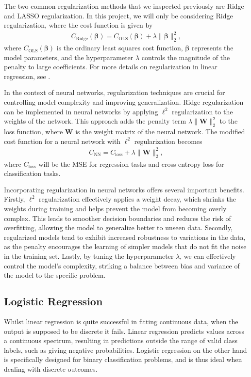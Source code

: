 \documentclass[%
reprint,s
amsmath,amssymb,
aps,
]{revtex4-2}
\begin{document}
The two common regularization methods that we inspected previously are Ridge and LASSO regularization. In this project, we will only be considering Ridge regularization, where the cost function is given by
\begin{align}
	C_\text{Ridge}(\bm \beta)=C_\text{OLS}(\bm\beta)+\lambda\|\bm\beta\|_2^2,
\end{align}
where \(C_\text{OLS}(\bm\beta)\) is the ordinary least squares cost function, \(\bm\beta\) represents the model parameters, and the hyperparameter \(\lambda\) controls the magnitude of the penalty to large coefficients. For more details on regularization in linear regression, see \cite{project1}.

In the context of neural networks, regularization techniques are crucial for controlling model complexity and improving generalization. Ridge regularization can be implemented in neural networks by applying \(\ell^2\) regularization to the weights of the network. This approach adds the penalty term \( \lambda \|\mathbf{W}\|_2^2 \) to the loss function, where \( \mathbf{W} \) is the weight matrix of the neural network. The modified cost function for a neural network with \(\ell^2\) regularization becomes
\begin{align}
	C_{\text{NN}}=C_{\text{loss}}+\lambda \|\mathbf{W}\|_2^2,
\end{align}
where \( C_{\text{loss}} \) will be the MSE for regression tasks and cross-entropy loss for classification tasks.

Incorporating regularization in neural networks offers several important benefits. Firstly, \(\ell^2\) regularization effectively applies a weight decay, which shrinks the weights during training and helps prevent the model from becoming overly complex. This leads to smoother decision boundaries and reduces the risk of overfitting, allowing the model to generalize better to unseen data. Secondly, regularized models tend to exhibit increased robustness to variations in the data, as the penalty encourages the learning of simpler models that do not fit the noise in the training set. Lastly, by tuning the hyperparameter \( \lambda \), we can effectively control the model's complexity, striking a balance between bias and variance of the model to the specific problem. 


\subsection{Logistic Regression}
Whilst linear regression is quite successful in fitting continuous data, when the output is supposed to be discrete it fails. Linear regression predicts values across a continuous spectrum, resulting in predictions outside the range of valid class labels, such as giving negative probabilities. Logistic regression on the other hand is specifically designed for binary classification problems, and is thus ideal when dealing with discrete outcomes. 
\end{document}
